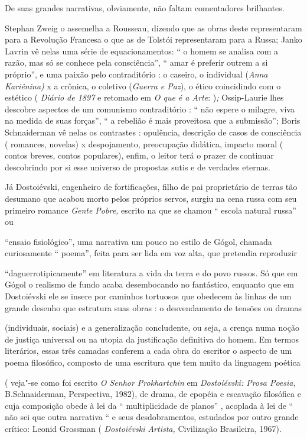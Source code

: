 De suas grandes narrativas, obviamente, não faltam comentadores
brilhantes.

Stephan Zweig o assemelha a Rousseau, dizendo que as obras deste
representaram para a Revolução Francesa o que as de Tolstói
representaram para a Russa; Janko Lavrin vê nelas uma série de
equacionamentos: `` o homem se analisa com a razão, mas só se conhece
pela consciência'', `` amar é preferir outrem a si próprio'', e uma
paixão pelo contraditório : o caseiro, o individual (\emph{Anna
Kariênina)} x a crônica, o coletivo (\emph{Guerra e Paz}), o ético
coincidindo com o estético ( \emph{Diário de 1897} e retomado em \emph{O
que é a Arte}: )\emph{;} Ossip-Laurie lhes descobre aspectos de um
comunismo contraditório : `` não espere o milagre, viva na medida de
suas forças'', `` a rebelião é mais proveitosa que a submissão''; Boris
Schnaiderman vê nelas os contrastes : opulência, descrição de casos de
consciência ( romances, novelas) x despojamento, preocupação didática,
impacto moral ( contos breves, contos populares), enfim, o leitor terá o
prazer de continuar descobrindo por si esse universo de propostas sutis
e de verdades eternas.

Já Dostoiévski, engenheiro de fortificações, filho de pai proprietário
de terras tão desumano que acabou morto pelos próprios servos, surgiu na
cena russa com seu primeiro romance \emph{Gente Pobre,} escrito na que
se chamou `` escola natural russa'' ou

``ensaio fisiológico'', uma narrativa um pouco no estilo de Gógol,
chamada curiosamente `` poema'', feita para ser lida em voz alta, que
pretendia reproduzir

``daguerrotipicamente'' em literatura a vida da terra e do povo russos.
Só que em Gógol o realismo de fundo acaba desembocando no fantástico,
enquanto que em Dostoiévski ele se insere por caminhos tortuosos que
obedecem às linhas de um grande desenho que estrutura suas obras : o
desvendamento de tensões ou dramas

(individuais, sociais) e a generalização concludente, ou seja, a crença
numa noção de justiça universal ou na utopia da justificação definitiva
do homem. Em termos literários, essas três camadas conferem a cada obra
do escritor o aspecto de um poema filosófico, composto de uma escritura
que tem muito da linguagem poética

( veja"-se como foi escrito \emph{O Senhor Prokhartchin} em
\emph{Dostoiévski: Prosa Poesia,} B.Schnaiderman, Perspectiva, 1982), de
drama, de epopéia e escavação filosófica e cuja composição obede à lei
da `` multiplicidade de planos'' , acoplada à lei de `` não sei que
outra narrativa `` e seus desdobramentos, estudados por outro grande
crítico: Leonid Grossman ( \emph{Dostoiévski Artista,} Civilização
Brasileira, 1967).


